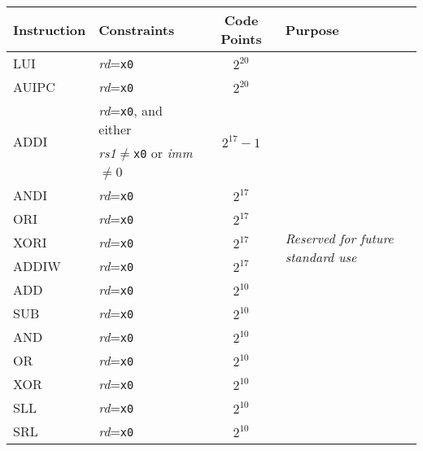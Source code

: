 \begin{table}[hbt]
\centering
\begin{tabular}{|l|l|c|l|}
  \hline
  Instruction           & Constraints                                 & Code Points & Purpose \\ \hline \hline
  LUI                   & {\em rd}={\tt x0}                           & $2^{20}$                    & \multirow{21}{*}{\em Reserved for future standard use} \\ \cline{1-3}
  AUIPC                 & {\em rd}={\tt x0}                           & $2^{20}$                    & \\ \cline{1-3}
  \multirow{2}{*}{ADDI} & {\em rd}={\tt x0}, and either               & \multirow{2}{*}{$2^{17}-1$} & \\
                        & {\em rs1}$\neq${\tt x0} or {\em imm}$\neq$0 &                             & \\ \cline{1-3}
  ANDI                  & {\em rd}={\tt x0}                           & $2^{17}$                    & \\ \cline{1-3}
  ORI                   & {\em rd}={\tt x0}                           & $2^{17}$                    & \\ \cline{1-3}
  XORI                  & {\em rd}={\tt x0}                           & $2^{17}$                    & \\ \cline{1-3}
  ADDIW                 & {\em rd}={\tt x0}                           & $2^{17}$                    & \\ \cline{1-3}
  ADD                   & {\em rd}={\tt x0}                           & $2^{10}$                    & \\ \cline{1-3}
  SUB                   & {\em rd}={\tt x0}                           & $2^{10}$                    & \\ \cline{1-3}
  AND                   & {\em rd}={\tt x0}                           & $2^{10}$                    & \\ \cline{1-3}
  OR                    & {\em rd}={\tt x0}                           & $2^{10}$                    & \\ \cline{1-3}
  XOR                   & {\em rd}={\tt x0}                           & $2^{10}$                    & \\ \cline{1-3}
  SLL                   & {\em rd}={\tt x0}                           & $2^{10}$                    & \\ \cline{1-3}
  SRL                   & {\em rd}={\tt x0}                           & $2^{10}$                    & \\ \cline{1-3}

\end{tabular}
\end{table}
